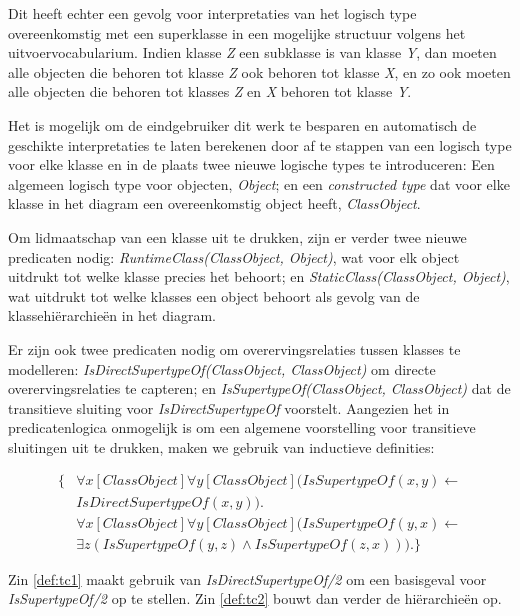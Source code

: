 Dit heeft echter een gevolg voor interpretaties van het logisch type overeenkomstig met een superklasse in een mogelijke structuur volgens het uitvoervocabularium. Indien klasse \textit{Z} een subklasse is van klasse \textit{Y}, dan moeten alle objecten die behoren tot klasse \textit{Z} ook behoren tot klasse \textit{X}, en zo ook moeten alle objecten die behoren tot klasses \textit{Z} en \textit{X} behoren tot klasse \textit{Y}.

Het is mogelijk om de eindgebruiker dit werk te besparen en automatisch de geschikte interpretaties te laten berekenen door af te stappen van een logisch type voor elke klasse en in de plaats twee nieuwe logische types te introduceren: Een algemeen logisch type voor objecten, \textit{Object}; en een \textit{constructed type}\cite{DeCatBroes2014PLaa} dat voor elke klasse in het diagram een overeenkomstig object heeft, \textit{ClassObject}.

Om lidmaatschap van een klasse uit te drukken, zijn er verder twee nieuwe predicaten nodig: \textit{RuntimeClass(ClassObject, Object)}, wat voor elk object uitdrukt tot welke klasse precies het behoort; en \textit{StaticClass(ClassObject, Object)}, wat uitdrukt tot welke klasses een object behoort als gevolg van de klassehi\"erarchie\"en in het diagram.

Er zijn ook twee predicaten nodig om overervingsrelaties tussen klasses te modelleren: \textit{IsDirectSupertypeOf(ClassObject, ClassObject)} om directe overervingsrelaties te capteren; en \textit{IsSupertypeOf(ClassObject, ClassObject)} dat de transitieve sluiting voor \textit{IsDirectSupertypeOf} voorstelt. Aangezien het in predicatenlogica onmogelijk is om een algemene voorstelling voor transitieve sluitingen uit te drukken, maken we gebruik van inductieve definities\cite{DeCatBroes2014PLaa}:

\begin{align}
\{
\nonumber &\forall{x}[ClassObject]\forall{y}[ClassObject](IsSupertypeOf(x,y) \leftarrow \\ &IsDirectSupertypeOf(x,y)).\label{def:tc1} \\
\nonumber &\forall{x}[ClassObject]\forall{y}[ClassObject](IsSupertypeOf(y,x) \leftarrow \\
&\exists{z}(IsSupertypeOf(y,z) \land IsSupertypeOf(z,x))).\label{def:tc2}
\}
\end{align}

Zin \ref{def:tc1} maakt gebruik van \textit{IsDirectSupertypeOf/2} om een basisgeval voor \textit{IsSupertypeOf/2} op te stellen. Zin \ref{def:tc2} bouwt dan verder de hi\"erarchie\"en op.

